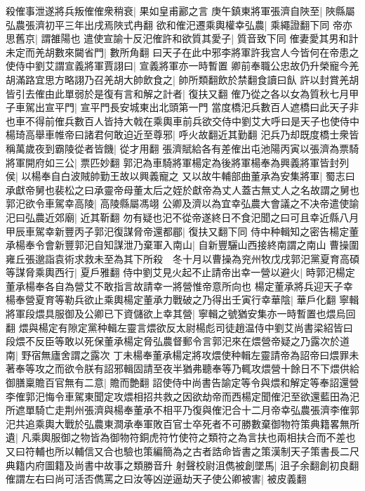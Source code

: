 殺傕事泄遂將兵叛傕傕衆稍衰|{
	果如皇甫酈之言}
庚午鎮東將軍張濟自陜至|{
	陜縣屬弘農張濟初平三年出戌焉陜式冉翻}
欲和傕汜遷乘輿權幸弘農|{
	乘繩證翻下同}
帝亦思舊京|{
	謂雒陽也}
遣使宣諭十反汜傕許和欲質其愛子|{
	質音致下同}
傕妻愛其男和計未定而羌胡數來闚省門|{
	數所角翻}
曰天子在此中邪李將軍許我宫人今皆何在帝患之使侍中劉艾謂宣義將軍賈詡曰|{
	宣義將軍亦一時暫置}
卿前奉職公忠故仍升榮寵今羌胡滿路宜思方略詡乃召羌胡大帥飲食之|{
	帥所類翻飲於禁翻食讀曰飤}
許以封賞羌胡皆引去傕由此單弱於是復有言和解之計者|{
	復扶又翻}
傕乃從之各以女為質秋七月甲子車駕出宣平門|{
	宣平門長安城東出北頭第一門}
當度橋汜兵數百人遮橋曰此天子非也車不得前傕兵數百人皆持大戟在乘輿車前兵欲交侍中劉艾大呼曰是天子也使侍中楊琦高舉車帷帝曰諸君何敢迫近至尊邪|{
	呼火故翻近其勤翻}
汜兵乃却既度橋士衆皆稱萬歲夜到霸陵從者皆饑|{
	從才用翻}
張濟賦給各有差傕出屯池陽丙寅以張濟為票騎將軍開府如三公|{
	票匹妙翻}
郭汜為車騎將軍楊定為後將軍楊奉為興義將軍皆封列侯|{
	以楊奉自白波賊帥勤王故以興義寵之}
又以故牛輔部曲董承為安集將軍|{
	蜀志曰承獻帝舅也裴松之曰承靈帝母董太后之姪於獻帝為丈人蓋古無丈人之名故謂之舅也}
郭汜欲令車駕幸高陵|{
	高陵縣屬馮翊}
公卿及濟以為宜幸弘農大會議之不决帝遣使諭汜曰弘農近郊廟|{
	近其靳翻}
勿有疑也汜不從帝遂終日不食汜聞之曰可且幸近縣八月甲辰車駕幸新豐丙子郭汜復謀脅帝還都郿|{
	復扶又翻下同}
侍中种輯知之密告楊定董承楊奉令會新豐郭汜自知謀泄乃棄軍入南山|{
	自新豐驪山西接終南謂之南山}
曹操圍雍丘張邈詣袁術求救未至為其下所殺　冬十月以曹操為兖州牧戊戌郭汜黨夏育高碩等謀脅乘輿西行|{
	夏戶雅翻}
侍中劉艾見火起不止請帝出幸一營以避火|{
	時郭汜楊定董承楊奉各自為營艾不敢指言故請幸一將營惟帝意所向也}
楊定董承將兵迎天子幸楊奉營夏育等勒兵欲止乘輿楊定董承力戰破之乃得出壬寅行幸華陰|{
	華戶化翻}
寧輯將軍段煨具服御及公卿已下資儲欲上幸其營|{
	寧輯之號猶安集亦一時暫置也煨烏回翻}
煨與楊定有隙定黨种輯左靈言煨欲反太尉楊彪司徒趙温侍中劉艾尚書梁紹皆曰段煨不反臣等敢以死保董承楊定脅弘農督郵令言郭汜來在煨營帝疑之乃露次於道南|{
	野宿無廬舍謂之露次}
丁未楊奉董承楊定將攻煨使种輯左靈請帝為詔帝曰煨罪未著奉等攻之而欲令朕有詔邪輯固請至夜半猶弗聽奉等乃輒攻煨營十餘日不下煨供給御膳稟贍百官無有二意|{
	贍而艶翻}
詔使侍中尚書告諭定等令與煨和解定等奉詔還營李傕郭汜悔令車駕東聞定攻煨相招共救之因欲劫帝而西楊定聞傕汜至欲還藍田為汜所遮單騎亡走荆州張濟與楊奉董承不相平乃復與傕汜合十二月帝幸弘農張濟李傕郭汜共追乘輿大戰於弘農東澗承奉軍敗百官士卒死者不可勝數棄御物符策典籍畧無所遺|{
	凡乘輿服御之物皆為御物符銅虎符竹使符之類符之為言扶也兩相扶合而不差也又曰符輔也所以輔信又合也驗也策編簡為之古者誥命皆書之策漢制天子策書長二尺典籍内府圖籍及尚書中故事之類勝音升}
射聲校尉沮儁被創墜馬|{
	沮子余翻創初良翻}
傕謂左右曰尚可活否儁罵之曰汝等凶逆逼劫天子使公卿被害|{
	被皮義翻}
